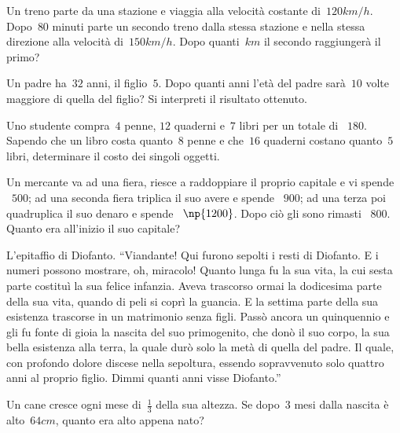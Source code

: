 \begin{multicols}{2}
\begin{esercizio}[\Ast]
Un treno parte da una stazione e viaggia alla velocità costante di~$120\unit{km/h}$. Dopo~$80$ minuti parte un secondo treno dalla stessa stazione e nella stessa direzione alla velocità di~$150\unit{km/h}$. Dopo quanti~$\unit{km}$ il secondo raggiungerà il primo?
\end{esercizio}

\begin{esercizio}[\Ast]
Un padre ha~$32$ anni, il figlio~$5$. Dopo quanti anni l'età del padre sarà~$10$ volte maggiore di quella del figlio? Si interpreti il risultato ottenuto.
\end{esercizio}

\begin{esercizio}[\Ast]
Uno studente compra~$4$ penne, $12$ quaderni e~$7$ libri per un totale di \officialeuro~$180$. Sapendo che un libro costa quanto~$8$ penne e che~$16$ quaderni costano quanto~$5$ libri, determinare il costo dei singoli oggetti.
\end{esercizio}

\begin{esercizio}[\Ast]
Un mercante va ad una fiera, riesce a raddoppiare il proprio capitale e vi spende \officialeuro~$500$; ad una seconda fiera triplica il suo avere e spende \officialeuro~$900$; ad una terza poi quadruplica il suo denaro e spende \officialeuro~$\np{1200}$. Dopo ciò gli sono rimasti \officialeuro~$800$. Quanto era all'inizio il suo capitale?
\end{esercizio}

\begin{esercizio}[\Ast]
L'epitaffio di Diofanto. ``Viandante! Qui furono sepolti i resti di Diofanto. E i numeri possono mostrare, oh, miracolo! Quanto lunga fu la sua vita, la cui sesta parte costituì la sua felice infanzia. Aveva trascorso ormai la dodicesima parte della sua vita, quando di peli si coprì la guancia. E la settima parte della sua esistenza trascorse in un matrimonio senza figli. Passò ancora un quinquennio e gli fu fonte di gioia la nascita del suo primogenito, che donò il suo corpo, la sua bella esistenza alla terra, la quale durò solo la metà di quella del padre. Il quale, con profondo dolore discese nella sepoltura, essendo sopravvenuto solo quattro anni al proprio figlio. Dimmi quanti anni visse Diofanto.''
\end{esercizio}

\begin{esercizio}[\Ast, \croce]
Un cane cresce ogni mese di~$\frac{1}{3}$ della sua altezza. Se dopo~$3$ mesi dalla nascita è alto~$64\unit{cm}$, quanto era alto appena nato?
\end{esercizio}


\end{multicols}
